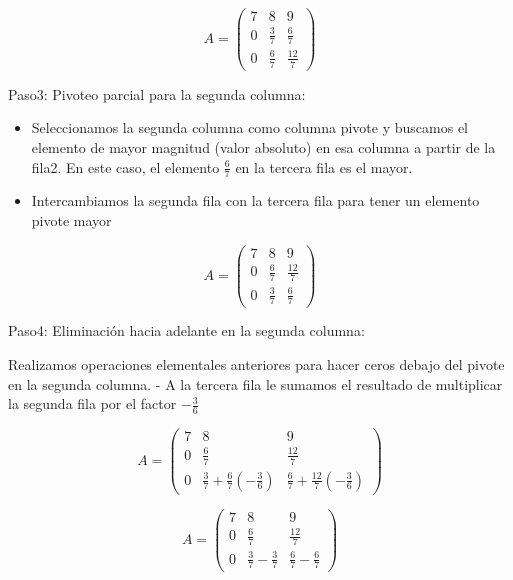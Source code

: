 \documentclass[11pt]{article}
\providecommand{\tightlist}{%
      \setlength{\itemsep}{0pt}\setlength{\parskip}{0pt}}
\begin{document}
    \begin{equation}
A =
    \begin{pmatrix}
        7 & 8 & 9\\
        0 & \frac{3}{7} & \frac{6}{7}\\
        0 & \frac{6}{7} & \frac{12}{7}
    \end{pmatrix}
\end{equation}

    Paso3: Pivoteo parcial para la segunda columna:

    \begin{itemize}
\tightlist
\item
  Seleccionamos la segunda columna como columna pivote y buscamos el
  elemento de mayor magnitud (valor absoluto) en esa columna a partir de
  la fila2. En este caso, el elemento \(\frac{6}{7}\) en la tercera fila
  es el mayor.
\item
  Intercambiamos la segunda fila con la tercera fila para tener un
  elemento pivote mayor
\end{itemize}

    \begin{equation}
A =
    \begin{pmatrix}
        7 & 8 & 9\\
        0 & \frac{6}{7} & \frac{12}{7}\\
        0 & \frac{3}{7} & \frac{6}{7}
    \end{pmatrix}
\end{equation}

    Paso4: Eliminación hacia adelante en la segunda columna:

    Realizamos operaciones elementales anteriores para hacer ceros debajo
del pivote en la segunda columna. - A la tercera fila le sumamos el
resultado de multiplicar la segunda fila por el factor \(-\frac{3}{6}\)

    \begin{equation}
A =
    \begin{pmatrix}
        7 & 8 & 9\\
        0 & \frac{6}{7} & \frac{12}{7}\\
        0 & \frac{3}{7}+\frac{6}{7} \left (-\frac{3}{6}\right) & \frac{6}{7}+\frac{12}{7} \left (-\frac{3}{6}\right)
    \end{pmatrix}
\end{equation}

    \begin{equation}
A =
    \begin{pmatrix}
        7 & 8 & 9\\
        0 & \frac{6}{7} & \frac{12}{7}\\
        0 & \frac{3}{7}-\frac{3}{7} & \frac{6}{7}-\frac{6}{7}
    \end{pmatrix}
\end{equation}
\end{document}
